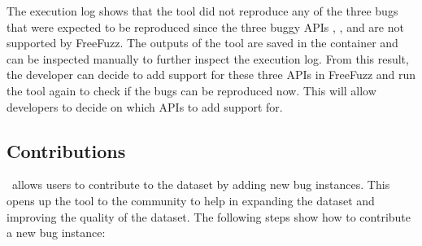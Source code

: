 \documentclass[sigconf,screen]{acmart}
\begin{document}



The execution log shows that the tool did not reproduce any of the
three bugs that were expected to be reproduced since the three buggy APIs , , and  are not supported by FreeFuzz. The outputs of the tool are saved in the container and can be inspected manually to further inspect the execution log. From this result, the developer can decide to add support for these three APIs in FreeFuzz and run the tool again to check if the bugs can be reproduced now. This will allow developers to decide on which APIs to add support for.

\subsection{Contributions}

\tname\ allows users to contribute to the dataset by adding new bug
instances. This opens up the tool to the community to help in
expanding the dataset and improving the quality of the dataset.
The following steps show how to contribute a new bug
instance:
\end{document}
